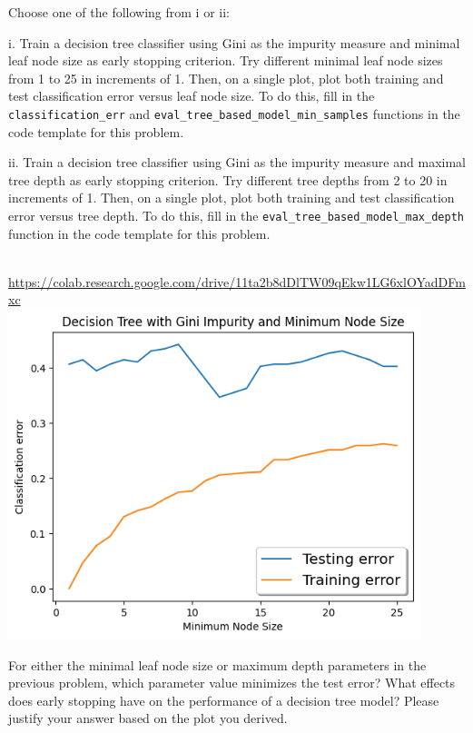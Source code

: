 \indent\problem[10] \smallskip 
Choose one of the following from i or ii: 

\noindent i. Train a decision tree classifier using Gini as the impurity measure and minimal leaf node size as early stopping criterion. Try different minimal leaf node sizes from 1 to 25 in increments of 1. Then, on a single plot, plot both training and test classification error versus leaf node size. To do this, fill in the \texttt{classification_err} and \texttt{eval_tree_based_model_min_samples} functions in the code template for this problem.


ii. Train a decision tree classifier using Gini as the impurity measure and maximal tree depth as early stopping criterion. Try different tree depths from 2 to 20 in increments of 1. Then, on a single plot, plot both training and test classification error versus tree depth. To do this, fill in the \texttt{eval_tree_based_model_max_depth} function in the code template for this problem.

\begin{solution}
    \\
    \url{https://colab.research.google.com/drive/11ta2b8dDlTW09qEkw1LG6xlOYadDFmxc} \\
    \includegraphics[width=12cm]{images/P2_A_i.png} \\
\end{solution}

\problem[6]
For either the minimal leaf node size or maximum depth parameters in the previous problem, which parameter value minimizes the test error? What effects does early stopping have on the performance of a decision tree model?
Please justify your answer based on the plot you derived.

